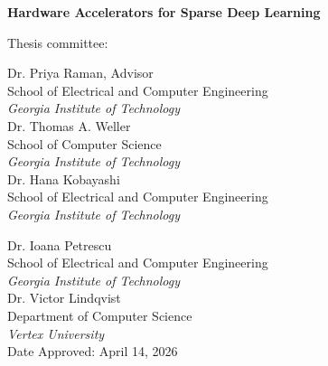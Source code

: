 \thispagestyle{empty}
\begin{singlespace}
\begin{center}
\vspace*{0.3in}
{\bfseries Hardware Accelerators for Sparse Deep Learning\par}
\end{center}
\vspace{1.5in}
\noindent Thesis committee:\par\vspace{1em}
\noindent\begin{minipage}[t]{0.47\linewidth}\raggedright
Dr. Priya Raman, Advisor\\
School of Electrical and Computer Engineering\\
\textit{Georgia Institute of Technology}\\[0.8em]
Dr. Thomas A. Weller\\
School of Computer Science\\
\textit{Georgia Institute of Technology}\\[0.8em]
Dr. Hana Kobayashi\\
School of Electrical and Computer Engineering\\
\textit{Georgia Institute of Technology}\\[0.8em]
\end{minipage}\hfill\begin{minipage}[t]{0.47\linewidth}\raggedright
Dr. Ioana Petrescu\\
School of Electrical and Computer Engineering\\
\textit{Georgia Institute of Technology}\\[0.8em]
Dr. Victor Lindqvist\\
Department of Computer Science\\
\textit{Vertex University}\\[0.8em]
\vspace{1em}Date Approved: April 14, 2026
\end{minipage}
\end{singlespace}
\clearpage
